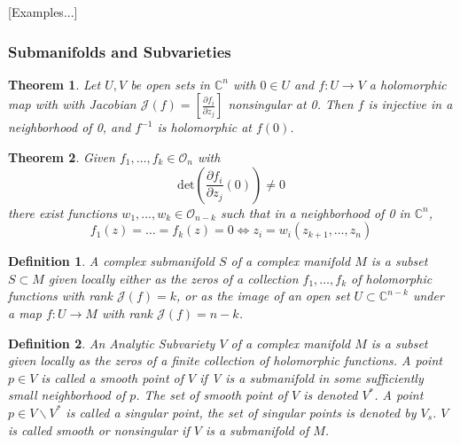 \documentclass{article}
\newtheorem{thm}{Theorem}
\newtheorem{defn}{Definition}
\begin{document}
[Examples...]


\subsubsection{Submanifolds and Subvarieties}


\begin{thm}

	Let $U,V$ be open sets in $ \mathbb{C}^n$ with $0 \in U$ and $ f: U \to V$ a holomorphic map with with Jacobian $ \mathcal{J}(f) = [ \frac{ \partial f_i }{\partial z_j } ]$ nonsingular at 0. Then $f$ is injective in a neighborhood of 0, and $f^{-1}$ is holomorphic at $f(0)$.

\end{thm}


\begin{thm}

Given $f_1, \ldots, f_k \in \mathcal{O}_n$ with 
\[
	\mathrm{det} \left( \frac{ \partial f_i }{\partial z_j }(0)  \right) \neq 0
\]
there exist functions $w_1, \ldots, w_k \in \mathcal{O}_{n-k}$ such that in a neighborhood of 0 in $ \mathbb{C}^n$,
\[
	f_1(z) = \ldots = f_k(z) = 0 \iff z_i = w_i (z_{k+1}, \ldots, z_n)
\]


\end{thm}



\begin{defn}

	A \textit{complex submanifold} $S$ of a complex manifold $M$ is a subset $S \subset M$ given locally either as the zeros of a collection $f_1,\ldots, f_k$ of holomorphic functions with rank $ \mathcal{J}(f) = k$, or as the image of an open set $U \subset \mathbb{C}^{n-k}$ under a map $ f: U \to M$ with rank $ \mathcal{J}(f) = n-k$.

\end{defn}


\begin{defn}

	An \textit{Analytic Subvariety} $V$ of a complex manifold $M$ is a subset given locally as the zeros of a finite collection of holomorphic functions. A point $p \in V$ is called a \textit{smooth point} of $V$ if V is a submanifold in some sufficiently small neighborhood of $p$. The set of smooth point of $V$ is denoted $V^*$. A point $p \in V \backslash V^*$ is called a \textit{singular point}, the set of singular points is denoted by $V_s$. $V$ is called \textit{smooth} or nonsingular if $V$ is a submanifold of $M$.

\end{defn}
\end{document}
